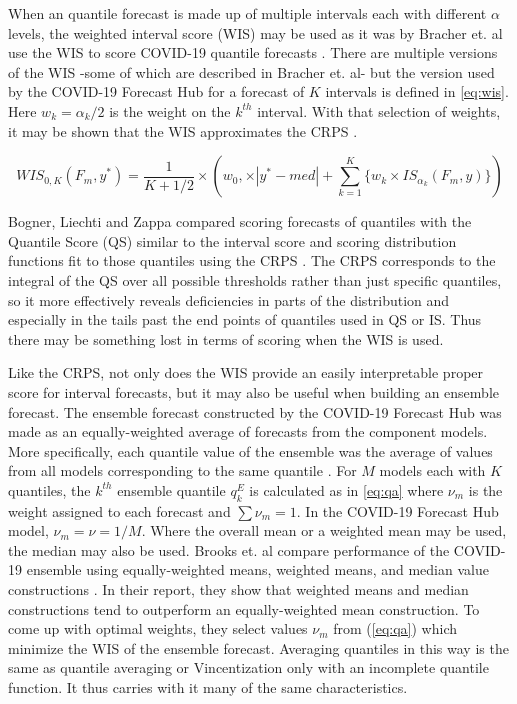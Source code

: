 \documentclass[11pt,notitlepage]{isuthesis}
\begin{document}
When an quantile forecast is made up of multiple intervals each with different
$\alpha$ levels, the weighted interval score (WIS) may be used as it was by
Bracher et.
al use the WIS to score COVID-19 quantile forecasts 
\cite{bracher2021evaluating}.
There are multiple versions of the WIS -some of 
which are described in Bracher et. al- but the version used by the COVID-19 
Forecast
Hub for a forecast of $K$ intervals is defined in \eqref{eq:wis}.
Here $w_k = \alpha_k/2$ is the weight on the $k^{th}$
interval. With that selection of weights, it may be shown that the
WIS approximates the CRPS \cite[see S1 Text therein]{bracher2021evaluating}.

\begin{equation}
\label{eq:wis}
  WIS_{0,K}(F_m,y^*) = \frac{1}{K + 1/2} \times (w_0, \times |y^*-med|+
  \sum_{k=1}^K \{ w_k \times IS_{\alpha_k}(F_m,y) \} )
\end{equation}


Bogner, Liechti and Zappa compared scoring forecasts of quantiles with the 
Quantile Score (QS) similar to the interval score and scoring distribution functions
fit to those quantiles using the CRPS \cite{bogner2017combining}. The CRPS 
corresponds to the integral of the QS over all possible thresholds rather than
just specific quantiles, so it more effectively reveals deficiencies in parts of 
the distribution and especially in the tails past the end points of quantiles
used in QS or IS. Thus there may be something lost in terms of scoring when the 
WIS is used.

Like the CRPS, not only does the WIS provide an easily interpretable proper 
score for interval forecasts, but it may also be useful when building an 
ensemble forecast.
The ensemble forecast constructed by the COVID-19 Forecast Hub was made as an
equally-weighted average of forecasts from the component models. More 
specifically, each quantile value of the ensemble was the average of values from
all models corresponding to the same quantile \cite{ray2020ensemble}. For $M$ 
models each with $K$ quantiles, the $k^{th}$ ensemble quantile $q^E_k$ is 
calculated as in \eqref{eq:qa}
where $\nu_m$ is the weight assigned to each forecast and $\sum \nu_m = 1$. In
the COVID-19 Forecast Hub model, $\nu_m = \nu = 1/M$. Where the overall mean or 
a weighted mean may be used, the median may also be used.
Brooks et. al compare performance of the COVID-19 ensemble
using equally-weighted means, weighted means, and median value constructions
\cite{brooks2020comparing}.
In their report, they show that weighted means and median constructions tend
to outperform an equally-weighted mean construction. To come up with optimal 
weights, they select values $\nu_m$ from (\ref{eq:qa}) which minimize the WIS of 
the ensemble forecast.
Averaging quantiles in this way is the same as quantile averaging or Vincentization
only with an incomplete quantile function. It thus carries with it many of the
same characteristics.
\end{document}
